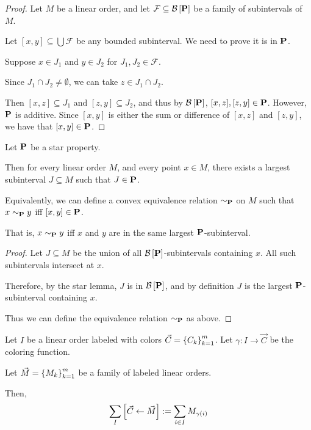 \begin{proof}
  Let $M$ be a linear order,
  and let $\mathcal{F} \subseteq \mathcal{B} \left[ {{\mathbf{P}}} \right]$ be a family of subintervals of $M$.

  Let $[x, y] \subseteq \bigcup \mathcal{F}$ be any bounded subinterval. We need to prove
  it is in $\mathbf{P}$.

  Suppose $x \in J_1$ and $y \in J_2$ for $J_1, J_2 \in \mathcal{F}$.

  Since $J_1 \cap J_2 \ne \emptyset$, we can take $z \in J_1 \cap J_2$.

  Then $[x, z] \subseteq J_1$ and $[z, y] \subseteq J_2$,
  and thus by $\mathcal{B} \left[ {{\mathbf{P}}} \right]$, $[x, z], [z, y] \in \mathbf{P}$.
  However, $\mathbf{P}$ is additive. Since $[x, y]$ is either the sum
  or difference of $[x, z]$ and $[z, y]$, we have that $[x, y] \in \mathbf{P}$.
\end{proof}

\begin{lemma}
  Let $\mathbf{P}$ be a star property.

  Then for every linear order $M$,
  and every point $x \in M$, there exists a largest subinterval $J \subseteq M$ such that
  $J \in \mathbf{P}$.

  Equivalently, we can define a convex equivalence relation $\sim_{\mathbf{P}}$ on $M$ such that $x \sim_{\mathbf{P}} y$ iff $[x, y] \in \mathbf{P}$.

  That is,
  $x \sim_{\mathbf{P}} y$ iff $x$ and $y$ are in the same largest $\mathbf{P}$-subinterval.

\end{lemma}

\begin{proof}
  Let $J \subseteq M$ be the union of all $\mathcal{B} \left[ {{\mathbf{P}}} \right]$-subintervals containing $x$.
  All such subintervals intersect at $x$.

  Therefore, by the star lemma, $J$ is in $\mathcal{B} \left[ {{\mathbf{P}}} \right]$, and by definition
  $J$ is the largest $\mathbf{P}$-subinterval containing $x$.

  Thus we can define the equivalence relation $\sim_{\mathbf{P}}$ as above.
\end{proof}

\begin{definition}
  Let $I$ be a linear order labeled with colors $\vec{C} = \left\{ {C_k} \right\}_{k=1}^m$.
  Let $\gamma : I \to \vec{C}$ be the coloring function.

  Let $\vec{M} = \left\{ {M_k} \right\}_{k=1}^m$ be a family of labeled linear orders.

  Then,
  \[\sum_{I} \left[ {{\vec{C}} \leftarrow {\vec{M}}} \right]
    := \sum_{i \in I}{M_{\gamma(i)}}\]
\end{definition}

